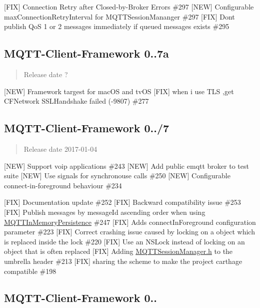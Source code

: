 \mbox{[}F\+IX\mbox{]} Connection Retry after Closed-\/by-\/\+Broker Errors \#297 \mbox{[}N\+EW\mbox{]} Configurable max\+Connection\+Retry\+Interval for M\+Q\+T\+T\+Session\+Mananger \#297 \mbox{[}F\+IX\mbox{]} Don\textquotesingle{}t publish QoS 1 or 2 messages immediately if queued messages exists \#295

\subsection*{M\+Q\+T\+T-\/\+Client-\/\+Framework 0..\+7a}

\begin{quote}
Release date ? \end{quote}


\mbox{[}N\+EW\mbox{]} Framework targest for mac\+OS and tv\+OS \mbox{[}F\+IX\mbox{]} when i use T\+LS ,get C\+F\+Network S\+S\+L\+Handshake failed (-\/9807) \#277

\subsection*{M\+Q\+T\+T-\/\+Client-\/\+Framework 0../7}

\begin{quote}
Release date 2017-\/01-\/04 \end{quote}


\mbox{[}N\+EW\mbox{]} Support voip applications \#243 \mbox{[}N\+EW\mbox{]} Add public emqtt broker to test suite \mbox{[}N\+EW\mbox{]} Use signals for synchronouse calls \#250 \mbox{[}N\+EW\mbox{]} Configurable connect-\/in-\/foreground behaviour \#234

\mbox{[}F\+IX\mbox{]} Documentation update \#252 \mbox{[}F\+IX\mbox{]} Backward compatibility issue \#253 \mbox{[}F\+IX\mbox{]} Publish messages by message\+Id ascending order when using \hyperlink{interface_m_q_t_t_in_memory_persistence}{M\+Q\+T\+T\+In\+Memory\+Persistence} \#247 \mbox{[}F\+IX\mbox{]} Adds connect\+In\+Foreground configuration parameter \#223 \mbox{[}F\+IX\mbox{]} Correct crashing issue caused by locking on a object which is replaced inside the lock \#220 \mbox{[}F\+IX\mbox{]} Use an N\+S\+Lock instead of locking on an object that is often replaced \mbox{[}F\+IX\mbox{]} Adding \hyperlink{_m_q_t_t_session_manager_8h_source}{M\+Q\+T\+T\+Session\+Manager.\+h} to the umbrella header \#213 \mbox{[}F\+IX\mbox{]} sharing the scheme to make the project carthage compatible \#198

\subsection*{M\+Q\+T\+T-\/\+Client-\/\+Framework 0..}


